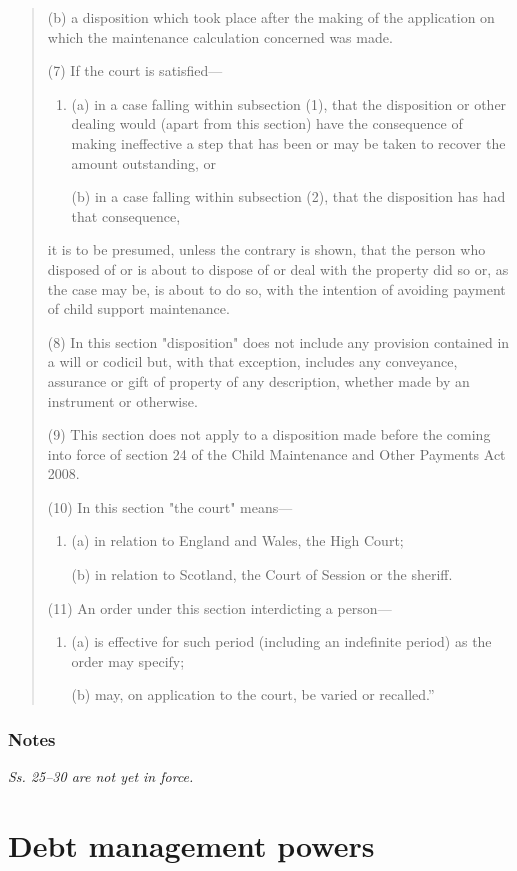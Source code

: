 \documentclass[a4paper]{article}
\newcommand\amendment[1]{\subsubsection*{Notes}{\itshape\frenchspacing\footnotesize #1 \par}}
\begin{document}
\begin{quotation}
\begin{enumerate}
(b) a disposition which took place after the making of the application on which the maintenance calculation concerned was made.
\end{enumerate}

(7) If the court is satisfied---
\begin{enumerate}\item[]
(a) in a case falling within subsection (1), that the disposition or other dealing would (apart from this section) have the consequence of making ineffective a step that has been or may be taken to recover the amount outstanding, or

(b) in a case falling within subsection (2), that the disposition has had that consequence,
\end{enumerate}
it is to be presumed, unless the contrary is shown, that the person who disposed of or is about to dispose of or deal with the property did so or, as the case may be, is about to do so, with the intention of avoiding payment of child support maintenance.

(8)
In this section "disposition" does not include any provision contained in a will or codicil but, with that exception, includes any conveyance, assurance or gift of property of any description, whether made by an instrument or otherwise.

(9)
This section does not apply to a disposition made before the coming into force of section 24 of the Child Maintenance and Other Payments Act 2008.

(10)
In this section "the court" means---
\begin{enumerate}\item[]
(a) in relation to England and Wales, the High Court;

(b) in relation to Scotland, the Court of Session or the sheriff.
\end{enumerate}

(11) An order under this section interdicting a person---
\begin{enumerate}\item[]
(a) is effective for such period (including an indefinite period) as the order may specify;

(b) may, on application to the court, be varied or recalled.''
\end{enumerate}
\end{quotation}

\amendment{Ss. 25--30 are not yet in force.}

\section{Debt management powers}
\end{document}
